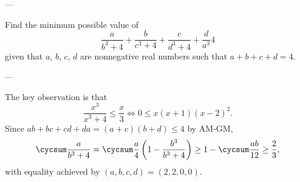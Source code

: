 
---

Find the minimum possible value of \[\frac a{b^3+4}+\frac b{c^3+4}+\frac c{d^3+4}+\frac d{a^3}4\]
given that $a$, $b$, $c$, $d$ are nonnegative real numbers such that $a+b+c+d=4$.

---

The key observation is that \[\frac{x^3}{x^3+4}\le\frac x3\iff 0\le x(x+1)(x-2)^2.\]
Since $ab+bc+cd+da=(a+c)(b+d)\le4$ by AM-GM, \[\cycsum\frac a{b^3+4}=\cycsum\frac a4\left(1-\frac{b^3}{b^3+4}\right)\ge1-\cycsum\frac{ab}{12}\ge\frac23,\]
with equality achieved by $(a,b,c,d)=(2,2,0,0)$.

